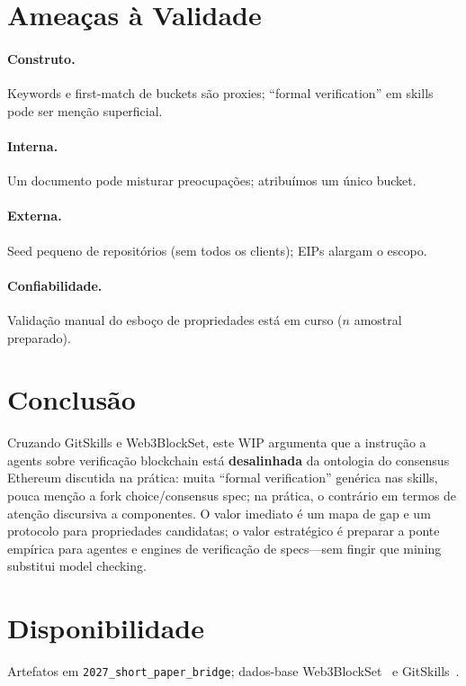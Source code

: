 \documentclass[10pt,conference]{IEEEtran}
\begin{document}
\section{Ameaças à Validade}
\paragraph{Construto.} Keywords e first-match de buckets são proxies; ``formal verification'' em skills pode ser menção superficial.
\paragraph{Interna.} Um documento pode misturar preocupações; atribuímos um único bucket.
\paragraph{Externa.} Seed pequeno de repositórios (sem todos os clients); EIPs alargam o escopo.
\paragraph{Confiabilidade.} Validação manual do esboço de propriedades está em curso ($n$ amostral preparado).

\section{Conclusão}
Cruzando GitSkills e Web3BlockSet, este WIP argumenta que a instrução a agents sobre verificação blockchain está \textbf{desalinhada} da ontologia do consensus Ethereum discutida na prática: muita ``formal verification'' genérica nas skills, pouca menção a fork choice/consensus spec; na prática, o contrário em termos de atenção discursiva a componentes. O valor imediato é um mapa de gap e um protocolo para propriedades candidatas; o valor estratégico é preparar a ponte empírica para agentes e engines de verificação de specs---sem fingir que mining substitui model checking.

\section*{Disponibilidade}
Artefatos em \texttt{2027\_short\_paper\_bridge}; dados-base Web3BlockSet~\cite{soares2026web3blockset} e GitSkills~\cite{gitskills2026}.



\end{document}
